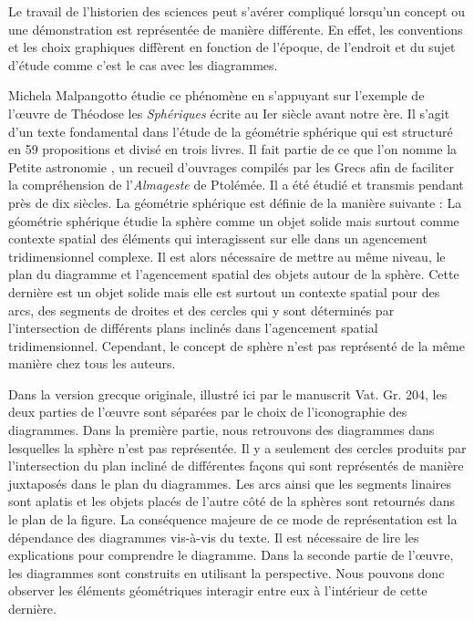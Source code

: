 Le travail de l'historien des sciences peut s'avérer compliqué lorsqu'un concept ou une démonstration est représentée de manière différente.
En effet, les conventions et les choix graphiques diffèrent en fonction de l'époque, de l'endroit et du sujet d'étude comme c'est le cas avec les diagrammes.

Michela Malpangotto étudie ce phénomène en s'appuyant sur l'exemple de l'œuvre de Théodose les \textit{Sphériques} écrite au Ier siècle avant notre ère.
Il s'agit d'un texte fondamental dans l'étude de la géométrie sphérique qui est structuré en 59 propositions et divisé en trois livres.
Il fait partie de ce que l'on nomme la \og Petite astronomie \fg, un recueil d'ouvrages compilés par les Grecs afin de faciliter la compréhension de l'\textit{Almageste} de Ptolémée.
Il a été étudié et transmis pendant près de dix siècles.
La géométrie sphérique est définie de la manière suivante : \og La géométrie sphérique étudie la sphère comme un objet solide mais surtout comme contexte spatial des éléments qui interagissent sur elle dans un agencement tridimensionnel complexe.
\fg Il est alors nécessaire de mettre au même niveau, le plan du diagramme et l'agencement spatial des objets autour de la sphère.
Cette dernière est un objet solide mais elle est surtout un contexte spatial pour des arcs, des segments de droites et des cercles qui y sont déterminés par l'intersection de différents plans inclinés dans l'agencement spatial tridimensionnel.
Cependant, le concept de sphère n'est pas représenté de la même manière chez tous les auteurs.

Dans la version grecque originale, illustré ici par le manuscrit Vat. Gr. 204, les deux parties de l'œuvre sont séparées par le choix de l'iconographie des diagrammes.
Dans la première partie, nous retrouvons des diagrammes dans lesquelles la sphère n'est pas représentée.
Il y a seulement des cercles produits par l'intersection du plan incliné de différentes façons qui sont représentés de manière juxtaposés dans le plan du diagrammes.
Les arcs ainsi que les segments linaires sont aplatis et les objets placés de l'autre côté de la sphères sont retournés dans le plan de la figure.
La conséquence majeure de ce mode de représentation est la dépendance des diagrammes vis-à-vis du texte.
Il est nécessaire de lire les explications pour comprendre le diagramme.
Dans la seconde partie de l'œuvre, les diagrammes sont construits en utilisant la perspective.
Nous pouvons donc observer les éléments géométriques interagir entre eux à l'intérieur de cette dernière.

